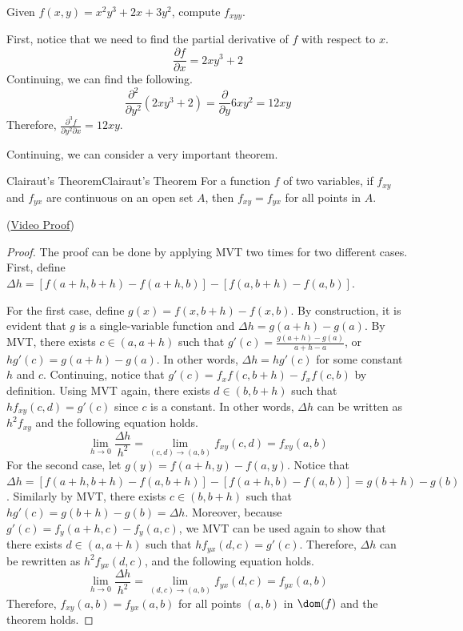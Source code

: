 \documentclass[../../../main.tex]{subfiles}
\begin{document}
\begin{problem}{}{}
Given $f(x, y) = x^2y^3 + 2x + 3y^2$, compute $f_{xyy}$.
\end{problem}
\begin{solution}
First, notice that we need to find the partial derivative of $f$
with respect to $x$.
\[
\frac{\partial f}{\partial x}
= 2xy^3 + 2
\]
Continuing, we can find the following.
\[
\frac{\partial^2}{\partial y^2} (2xy^3 + 2)
= \frac{\partial}{\partial y} 6xy^2
= 12xy
\]
Therefore, $\frac{\partial^3 f}{\partial y^2 \partial x} = 12xy$.
\end{solution}

Continuing, we can consider a very important theorem.

\begin{theorem}{Clairaut's Theorem}{Clairaut's Theorem}
For a function $f$ of two variables, if $f_{xy}$ and $f_{yx}$ are
continuous on an open set $A$, then $f_{xy} = f_{yx}$ for all points
in $A$.
\end{theorem}
(\href{https://youtu.be/7vO3xPjTP_4}{Video Proof})
\begin{proof}
The proof can be done by applying MVT two times for two different
cases. First, define $\Delta h = [f(a + h, b + h) - f(a + h, b)]
- [f(a, b + h) - f(a, b)]$.

For the first case, define $g(x) = f(x, b + h) - f(x, b)$.
By construction, it is evident that $g$ is a single-variable function
and $\Delta h = g(a + h) - g(a)$. By MVT, there exists $c \in
(a, a + h)$ such that $g'(c) = \frac{g(a + h) - g(a)}{a + h - a}$,
or $h g'(c) = g(a + h) - g(a)$. In other words, $\Delta h = hg'(c)$
for some constant $h$ and $c$. Continuing, notice that $g'(c)
= f_x f(c, b + h) - f_x f(c, b)$ by definition. Using MVT again,
there exists $d \in (b, b + h)$ such that $h f_{xy} (c, d) = g'(c)$
since $c$ is a constant. In other words, $\Delta h$ can be written
as $h^2 f_{xy}$ and the following equation holds.
\[
\lim_{h \to 0} \frac{\Delta h}{h^2}
= \lim_{(c, d) \to (a, b)} f_{xy} (c, d)
= f_{xy} (a, b)
\]
For the second case, let $g(y) = f(a + h, y) - f(a, y)$. Notice that
$\Delta h = [f(a + h, b + h) - f(a, b + h)] - [f(a + h, b) - f(a, b)]
= g(b + h) - g(b)$. Similarly by MVT, there exists $c \in (b, b + h)$
such that $h g'(c) = g(b + h) - g(b) = \Delta h$. Moreover, because
$g'(c) = f_y (a + h, c) - f_y (a, c)$, we MVT can be used again to
show that there exists $d \in (a, a + h)$ such that $h f_{yx} (d, c) =
g'(c)$. Therefore, $\Delta h$ can be rewritten as $h^2 f_{yx} (d, c)$,
and the following equation holds.
\[
\lim_{h \to 0} \frac{\Delta h}{h^2}
= \lim_{(d, c) \to (a, b)} f_{yx} (d, c)
= f_{yx} (a, b)
\]
Therefore, $f_{xy} (a, b) = f_{yx} (a, b)$ for all points $(a, b)$
in $\dom(f)$ and the theorem holds.
\end{proof}
\end{document}
